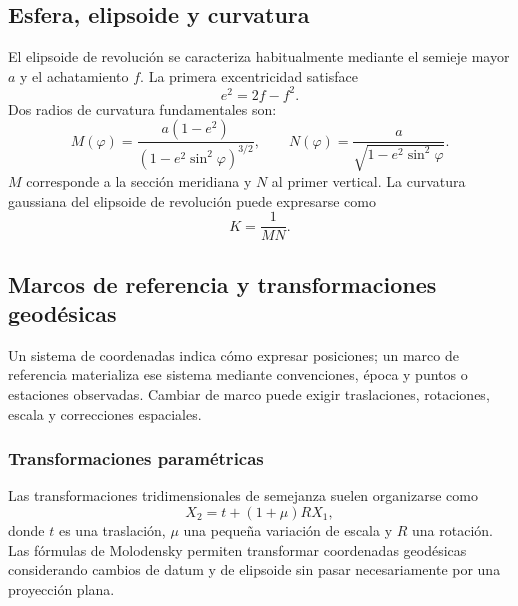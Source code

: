 \subsection{Esfera, elipsoide y curvatura}

El elipsoide de revolución se caracteriza habitualmente mediante el semieje mayor \(a\) y
el achatamiento \(f\). La primera excentricidad satisface
\[
  e^2=2f-f^2.
\]
Dos radios de curvatura fundamentales son:
\[
  \boxed{
  M(\varphi)=
  \frac{a(1-e^2)}{(1-e^2\sin^2\varphi)^{3/2}}
  },
  \qquad
  \boxed{
  N(\varphi)=
  \frac{a}{\sqrt{1-e^2\sin^2\varphi}}
  }.
\]
\(M\) corresponde a la sección meridiana y \(N\) al primer vertical. La curvatura gaussiana
del elipsoide de revolución puede expresarse como
\[
  K=\frac{1}{MN}.
\]

\begin{center}
\end{center}

\subsection{Marcos de referencia y transformaciones geodésicas}

Un sistema de coordenadas indica cómo expresar posiciones; un marco de referencia materializa
ese sistema mediante convenciones, época y puntos o estaciones observadas. Cambiar de marco
puede exigir traslaciones, rotaciones, escala y correcciones espaciales.

\subsubsection{Transformaciones paramétricas}

Las transformaciones tridimensionales de semejanza suelen organizarse como
\[
  X_2=t+(1+\mu)RX_1,
\]
donde \(t\) es una traslación, \(\mu\) una pequeña variación de escala y \(R\) una rotación.
Las fórmulas de Molodensky permiten transformar coordenadas geodésicas considerando cambios
de datum y de elipsoide sin pasar necesariamente por una proyección plana.

